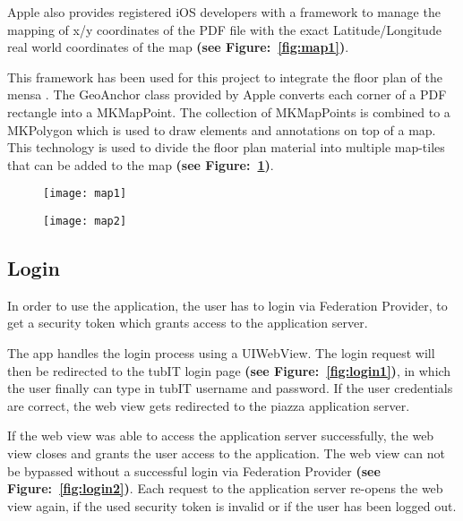 Apple also provides registered iOS developers with a framework to manage the mapping of x/y coordinates of the PDF file with the exact Latitude/Longitude real world coordinates of the map
\textbf{(see Figure:~\ref{fig:map1})}.

This framework has been used for this project to integrate the floor plan of the mensa \cite{AppleFootprint}. The GeoAnchor class provided by Apple converts each corner of a PDF rectangle into a MKMapPoint. The collection of MKMapPoints is combined to a MKPolygon which is used to draw elements and annotations on top of a map. This technology is used to divide the floor plan material into multiple map-tiles that can be added to the map \textbf{(see Figure:~\ref{fig:map2})}.


\begin{figure}
\centering
\begin{minipage}{.5\textwidth}
  \centering
  \texttt{[image: map1]}
  \label{fig:map1}
\end{minipage}%
\begin{minipage}{.5\textwidth}
  \centering
  \texttt{[image: map2]}
  \label{fig:map2}
\end{minipage}
\end{figure}


\subsection{Login}

In order to use the application, the user has to login via Federation Provider, to get
a security token which grants access to the application server.

The app handles the login process using a UIWebView. The login request will then be redirected
to the tubIT login page \textbf{(see Figure:~\ref{fig:login1})}, in which the user finally can type in tubIT username and password. If the user credentials are correct, the web view gets redirected to the piazza application server.

If the web view was able to access the application server successfully, the web view closes and grants the user access to the application. The web view can not be bypassed without a successful login via Federation Provider \textbf{(see Figure:~\ref{fig:login2})}. Each request to the application server re-opens the web view again, if the used security token is invalid or if the user has been logged out.


